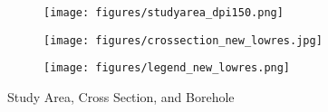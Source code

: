 \begin{figure}[H]
	\centering
	
	\begin{subfigure}[b]{0.48\textwidth}
		\centering
		\texttt{[image: figures/studyarea\_dpi150.png]}
		\label{fig:studyarea_a}
	\end{subfigure}
	\hfill
	\begin{minipage}[b]{0.48\textwidth}
		\begin{subfigure}[b]{\textwidth}
			\centering
			\texttt{[image: figures/crossection\_new\_lowres.jpg]}
			\label{fig:studyarea_b}
		\end{subfigure}
		
		\vspace{0.05cm}
		
		\begin{subfigure}[b]{\textwidth}
			\centering
			\texttt{[image: figures/legend\_new\_lowres.png]}
			\label{fig:studyarea_c}
		\end{subfigure}
		
		\vspace{0.05cm}
		
	\end{minipage}
	
	\caption[Study Area]{%
		Study Area, Cross Section, and Borehole
		\label{fig:studyarea}
	}	
\end{figure}
%
%	
%	


